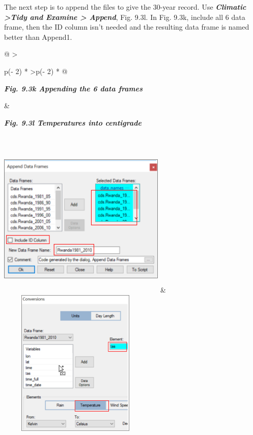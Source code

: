 \documentclass[
  letterpaper,
  DIV=11,
  numbers=noendperiod]{scrreprt}
\begin{document}
The next step is to append the files to give the 30-year record. Use
\textbf{\emph{Climatic \textgreater Tidy and Examine \textgreater{}
Append}}, Fig. 9.3l. In Fig. 9.3k, include all 6 data frame, then the ID
column isn't needed and the resulting data frame is named better than
Append1.

\begin{longtable}[]{@{}
  >{\raggedright\arraybackslash}p{(\columnwidth - 2\tabcolsep) * }
  >{\raggedleft\arraybackslash}p{(\columnwidth - 2\tabcolsep) * }@{}}
\toprule\noalign{}
\begin{minipage}[b]{\linewidth}\raggedright
\textbf{\emph{Fig. 9.3k Appending the 6 data frames}}
\end{minipage} & \begin{minipage}[b]{\linewidth}\raggedleft
\textbf{\emph{Fig. 9.3l Temperatures into centigrade}}
\end{minipage} \\
\midrule\noalign{}
\endhead
\bottomrule\noalign{}
\endlastfoot
\includegraphics[width=3.14829in,height=3.01165in]{figures/Fig9.3k.png}
&
\includegraphics[width=2.91954in,height=2.77761in]{figures/Fig9.3l.png} \\
\end{longtable}
\end{document}
